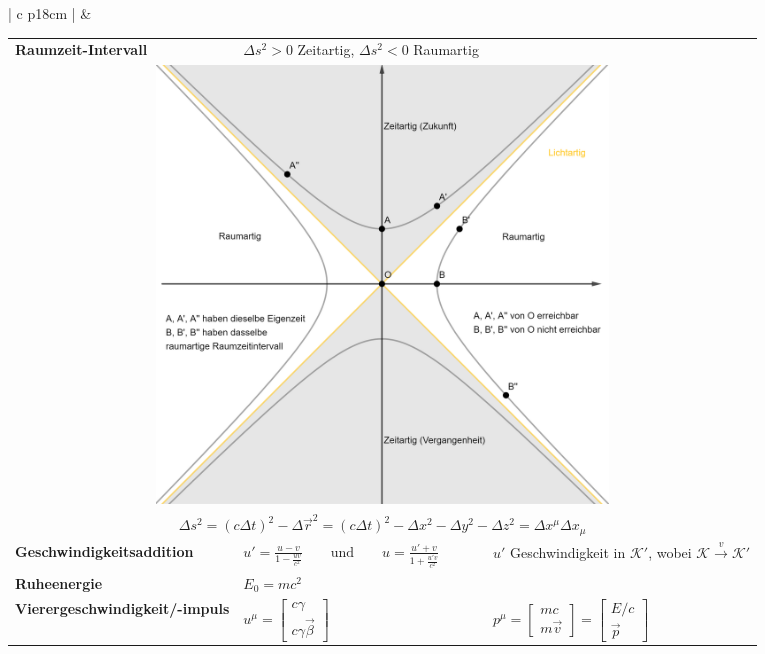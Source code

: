 	
\begin{tabular}{ | c   p{18cm} |}
	\hline
	\rotcell{\large\textbf{\textcolor{white}{Spezielle Relativitätstheorie}}}  &
	\setlength{\extrarowheight}{10pt}	
	
	\begin{tabular}{L{5cm} L{6.5cm} L{5.3cm}}
		\textbf{Raumzeit-Intervall }&$\Delta s^2 >0$ Zeitartig, $\Delta s^2 <0$ Raumartig  &\\
		\\
		  \\
		
		
		\textbf{Geschwindigkeitsaddition}& $\displaystyle u' = \frac{u-v}{1-\frac{uv}{c^2}} \qquad\text{und}\qquad u = \frac{u'+v}{1+\frac{u'v}{c^2}}$ & $u'$ Geschwindigkeit in $\displaystyle \mathcal{K}'$, wobei $\displaystyle \mathcal{K}\xrightarrow{v}\mathcal{K}'$\\[10pt]
		

		\textbf{Ruheenergie}&$\displaystyle E_0 = mc^2$&\\

		\textbf{Vierergeschwindigkeit/-impuls}&$u^\mu =
			\left[\begin{array}{c}
			c\gamma\\
			c\gamma\vec{\beta}
		\end{array}\right]$ &
		$p^\mu = 
		\left[\begin{array}{c}
		mc\\
		m\vec{v}
		\end{array}\right]
		=
		\left[\begin{array}{c}
		E/c\\
		\vec{p}
		\end{array}\right]$\\
		

\end{tabular}
\end{tabular}
